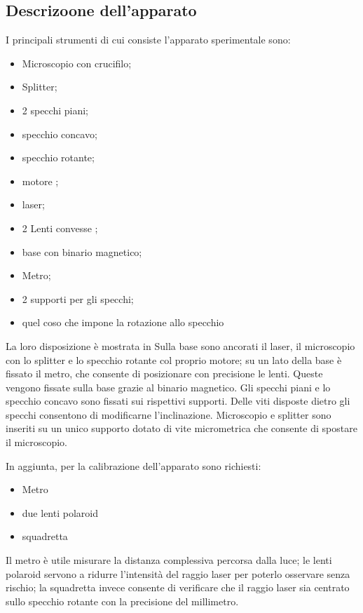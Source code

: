\subsection{Descrizoone dell'apparato}
I principali strumenti di cui consiste l'apparato sperimentale sono:
\begin{itemize}
\item Microscopio con crucifilo;
\item Splitter;
\item 2 specchi piani;
\item specchio concavo;
\item specchio rotante;
\item motore ;
\item laser;
\item 2  Lenti convesse ;
\item base con binario magnetico;
\item Metro;
\item 2 supporti per gli specchi;
\item quel coso che impone la rotazione allo specchio %
\end{itemize}
La loro disposizione è mostrata in %
Sulla base sono ancorati il laser, il microscopio con lo splitter e lo specchio rotante col proprio motore; su un lato della base è fissato il metro, che consente 
di posizionare con precisione le lenti. Queste vengono fissate sulla base grazie al binario magnetico. Gli specchi piani e lo specchio concavo sono fissati sui 
rispettivi supporti. Delle viti disposte dietro gli specchi consentono di modificarne l'inclinazione. Microscopio e splitter sono  inseriti su un unico supporto
dotato di vite micrometrica che consente di spostare il microscopio.


In aggiunta, per la calibrazione dell'apparato sono richiesti:
\begin{itemize}
\item Metro 
\item due lenti polaroid 
\item squadretta 
\end{itemize}
Il metro è utile misurare la distanza complessiva percorsa dalla luce; le lenti polaroid servono a ridurre l'intensità del raggio laser per poterlo osservare senza
rischio; la squadretta invece consente di verificare che il raggio laser sia centrato sullo specchio rotante con la precisione del millimetro.
